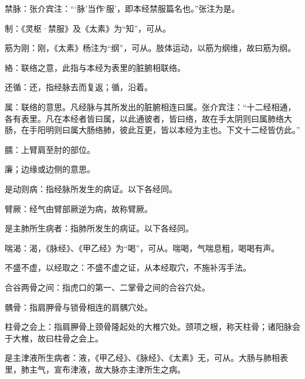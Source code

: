 \documentclass[12pt]{ctexbook}%
\begin{document}
\begin{jiaozhu}
	\item 禁脉：张介宾注：“‘脉’当作‘服’，即本经禁服篇名也。”张注为是。
	\item 制：《灵枢·禁服》及《太素》为“知”，可从。
	\item 筋为刚：刚，《太素》杨注为“纲”，可从。肢体运动，以筋为纲维，故曰筋为纲。
	\item 絡：联络之意，此指与本经为表里的脏腑相联络。
	\item 还循：还，指经脉去而复返；循，沿着。
	\item 属：联络的意思。凡经脉与其所发出的脏腑相连曰属。张介宾注：“十二经相通，各有表里。凡在本经者皆曰属，以此通彼者，皆曰络，故在手太阴则曰属肺络大肠，在手阳明则曰属大肠络肺，彼此互更，皆以本经为主也。下文十二经皆仿此。”
	\item 臑：上臂肩至肘的部位。
	\item 廉；边缘或边侧的意思。
	\item 是动则病：指经脉所发生的病证。以下各经同。
	\item 臂厥：经气由臂部厥逆为病，故称臂厥。
	\item 是主肺所生病者：指肺所发生的病证。以下各经同。
	\item 喘渴：渴，《脉经》、《甲乙经》为“喝”，可从。喘喝，气喘息粗，喝喝有声。
	\item 不盛不虚，以经取之：不盛不虚之证，从本经取穴，不施补泻手法。
	\item 合谷两骨之间：指虎口的第一、二掌骨之间的合谷穴处。
	\item 髃骨：指肩胛骨与锁骨相连的肩髃穴处。
	\item 柱骨之会上：指肩胛骨上颈骨隆起处的大椎穴处。颈项之根，称天柱骨；诸阳脉会于大椎，故曰柱骨之会上。
	\item 是主津液所生病者：液，《甲乙经》、《脉经》、《太素》无，可从。大肠与肺相表里，肺主气，宣布津液，故大脉亦主津所生之病。
\end{jiaozhu}

\end{document}
